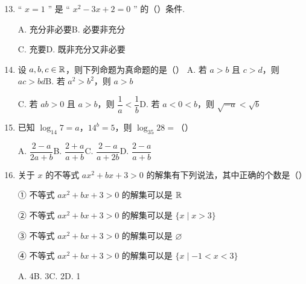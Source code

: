 \documentclass[a4paper,11pt]{article}
\begin{document}
\begin{enumerate}
\setcounter{enumi}{12}

\item “ $x=1$ ” 是 “ $x^2-3x+2=0$ ” 的\mbox{（\quad）}条件.

\keepwithprev
A. 充分非必要\qquad B. 必要非充分

C. 充要\qquad D. 既非充分又非必要

\ifanswer
\solbegin
{}
\solend
\fi

\item 设 $a,b,c\in\mathbb{R}$，则下列命题为真命题的是\mbox{（\quad）}
\keepwithprev
A. 若 $a>b$ 且 $c>d$，则 $ac>bd$\qquad B. 若 $a^2>b^2$，则 $a>b$

C. 若 $ab>0$ 且 $a>b$，则 $\dfrac1a<\dfrac1b$\qquad D. 若 $a<0<b$，则 $\sqrt{-a}<\sqrt b$

\ifanswer
\solbegin
{}
\solend
\fi

\item 已知 $\log_{14}7=a$，$14^b=5$，则 $\log_{35}28=$\mbox{（\quad）}

\keepwithprev
A. $\dfrac{2-a}{2a+b}$\qquad B. $\dfrac{2+a}{a+b}$\qquad C. $\dfrac{2-a}{a+2b}$\qquad D. $\dfrac{2-a}{a+b}$

\ifanswer
\solbegin
{}
\solend
\fi

\item 关于 $x$ 的不等式 $ax^2+bx+3>0$ 的解集有下列说法，其中正确的个数是\mbox{（\quad）}

\keepwithprev
① 不等式 $ax^2+bx+3>0$ 的解集可以是 $\mathbb{R}$

② 不等式 $ax^2+bx+3>0$ 的解集可以是 $\{x\mid x>3\}$

③ 不等式 $ax^2+bx+3>0$ 的解集可以是 $\varnothing$

④ 不等式 $ax^2+bx+3>0$ 的解集可以是 $\{x\mid -1<x<3\}$

\keepwithprev
A. 4\qquad B. 3\qquad C. 2\qquad D. 1

\ifanswer
\solbegin
{}
\solend
\fi

\end{enumerate}
\end{document}
